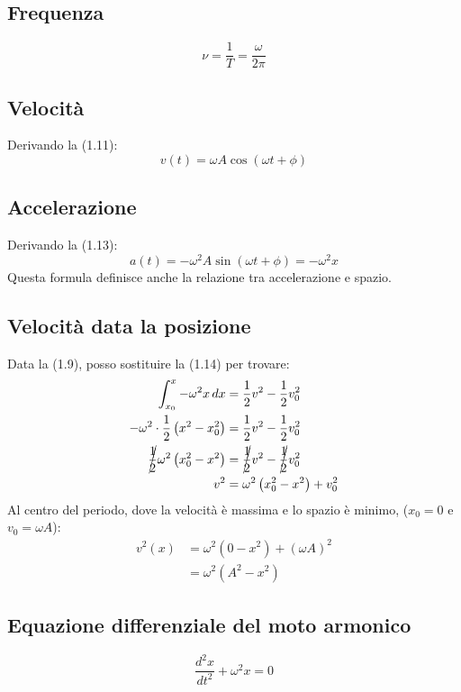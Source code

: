\documentclass{report}
\begin{document}
\subsection{Frequenza}
\begin{equation*}
    \nu = \frac{1}{T} = \frac{\omega}{2\pi}
\end{equation*}
\subsection{Velocità}
Derivando la (1.11):
\begin{equation}
    v(t) = \omega A\cos(\omega t + \phi)
\end{equation}
\subsection{Accelerazione}
Derivando la (1.13):
\begin{equation}
    a(t) = -\omega^2 A\sin(\omega t + \phi) = -\omega^2 x
\end{equation}
Questa formula definisce anche la relazione tra accelerazione e spazio.
\subsection{Velocità data la posizione}
Data la (1.9), posso sostituire la (1.14) per trovare:
\begin{align*}
    \int_{x_0}^{x} -\omega^2 x\,dx & = \frac{1}{2}v^2 - \frac{1}{2}v_0^2 \\
    -\omega^2\cdot\frac{1}{2}\left(x^2 - x_0^2\right) & = \frac{1}{2}v^2 - \frac{1}{2}v_0^2 \\
    \cancel{\frac{1}{2}}\omega^2\left(x_0^2 - x^2\right) & = \cancel{\frac{1}{2}}v^2 - \cancel{\frac{1}{2}}v_0^2 \\
    v^2 & = \omega^2\left(x_0^2 - x^2\right) + v_0^2 
\end{align*}
Al centro del periodo, dove la velocità è massima e lo spazio è minimo, (\(x_0 = 0\) e \(v_0 = \omega A \)):
\begin{align}
    v^{2}(x) & = \omega^2\left(0 - x^2\right) + (\omega A)^2 \nonumber \\
    & = \omega^2\left(A^2 - x^2\right)
\end{align}
\subsection{Equazione differenziale del moto armonico}
\begin{equation}
    \frac{d^{2}x}{dt^2} + \omega^2 x = 0
\end{equation}
\end{document}
